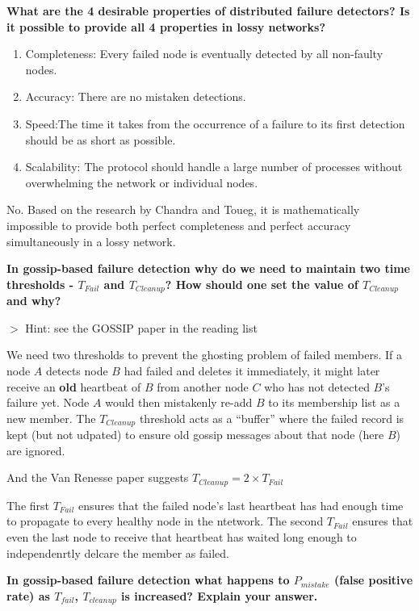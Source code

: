 \documentclass[12pt,a4paper]{article}
\newcommand{\remark}[1]{
    $>$ {\color{blue} #1}
}
\begin{document}
\textbf{What are the 4 desirable properties of distributed failure detectors? Is it possible to provide all 4 properties in lossy networks?}

\begin{enumerate}
    \item Completeness: Every failed node is eventually detected by all non-faulty nodes.
    \item Accuracy: There are no mistaken detections.
    \item Speed:The time it takes from the occurrence of a failure to its first detection should be as short as possible.
    \item Scalability: The protocol should handle a large number of processes without overwhelming the network or individual nodes.
\end{enumerate}

No. Based on the research by Chandra and Toueg, it is mathematically impossible to provide both perfect completeness and perfect accuracy simultaneously in a lossy network.

\textbf{In gossip-based failure detection why do we need to maintain two time thresholds - $T_{Fail}$ and $T_{Cleanup}$? How should one set the value of $T_{Cleanup}$ and why?}

\remark{Hint: see the GOSSIP paper in the reading list}

We need two thresholds to prevent the ghosting problem of failed members. If a node $A$ detects node $B$ had failed and deletes it immediately, 
it might later receive an \textbf{old} heartbeat of $B$ from another node $C$ who has not detected $B$'s failure yet. 
Node $A$ would then mistakenly re-add $B$ to its membership list as a new member. 
The $T_{Cleanup}$ threshold acts as a ``buffer'' where the failed record is kept (but not udpated) to ensure old gossip messages about that node (here $B$) are ignored.

And the Van Renesse paper suggests $T_{Cleanup} = 2 \times T_{Fail}$

The first $T_{Fail}$ ensures that the failed node's last heartbeat has had enough time to propagate to every healthy node in the ntetwork. 
The second $T_{Fail}$ ensures that even the last node to receive that heartbeat has waited long enough to independenrtly delcare the member as failed.

\textbf{In gossip-based failure detection what happens to $P_{mistake}$ (false positive rate) as $T_{fail}$, $T_{cleanup}$ is increased? Explain your answer.}
\end{document}

